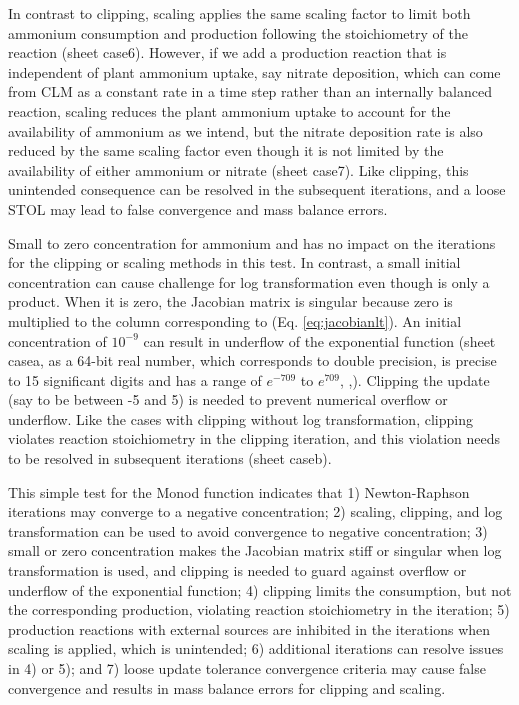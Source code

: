 \documentclass[gmd, manuscript]{copernicus}
\begin{document}
In contrast to clipping, scaling applies the same scaling factor to limit both
ammonium consumption and  production following the stoichiometry
of the reaction (sheet case6). However, if we add a production reaction that is
independent of plant ammonium uptake, say nitrate deposition, which can come
from CLM as a constant rate in a time step rather than an internally balanced
reaction, scaling reduces the plant ammonium uptake to account for the
availability of ammonium as we intend, but the nitrate deposition rate is also
reduced by the same scaling factor even though it is not limited by the
availability of either ammonium or nitrate (sheet case7). Like clipping, this
unintended consequence can be resolved in the subsequent iterations, and a
loose STOL may lead to false convergence and mass balance errors.

Small to zero concentration for ammonium and  has no impact on the
iterations for the clipping or scaling methods in this test. In contrast, a
small initial  concentration can cause challenge for log
transformation even though  is only a product. When it is zero,
the Jacobian matrix is singular because zero is multiplied to the column
corresponding to  (Eq. \ref{eq:jacobianlt}). An initial
 concentration of $10^{-9}$ can result in underflow of the
exponential function (sheet casea, as a 64-bit real number, which corresponds
to double precision, is precise to 15 significant digits and has a range of
$e^{-709}$ to $e^{709}$, \citeauthor{Lemmon2005},\citeyear{Lemmon2005}).
Clipping the update (say to be between -5 and 5) is needed to prevent numerical
overflow or underflow. Like the cases with clipping without log transformation,
clipping violates reaction stoichiometry in the clipping iteration, and this
violation needs to be resolved in subsequent iterations (sheet caseb).

This simple test for the Monod function indicates that 
1) Newton-Raphson iterations may converge to a negative concentration; 
2) scaling, clipping, and log transformation can be used to avoid convergence
to negative concentration; 
3) small or zero concentration makes the Jacobian matrix stiff or singular when
log transformation is used, and clipping is needed to guard against overflow or
underflow of the exponential function; 
4) clipping limits the consumption, but not the corresponding production,
violating reaction stoichiometry in the iteration; 
5) production reactions with external sources are inhibited in the iterations
when scaling is applied, which is unintended; 
6) additional iterations can resolve issues in 4) or 5); and
7) loose update tolerance convergence criteria may cause false convergence and
results in mass balance errors for clipping and scaling.
\end{document}

